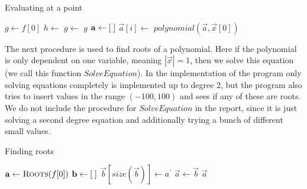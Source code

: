 \begin{algorithm}[H]
  \caption{Evaluating at a point}
  \begin{algorithmic}[1]
        \State $g\gets f[0]$
          \State $h\gets$ 
          \State $g\gets$ 
        \EndFor
        \State \Return $g$
      \Else
        \State $\mathbf{a}\gets[\hspace*{1mm}]$
          \State $\vec{a}[i]\gets$ 
        \EndFor
        \State \Return $polynomial(\vec{a},\vec{x}[0])$
      \EndIf
    \EndProcedure
  \end{algorithmic}
\end{algorithm}

The next procedure is used to find roots of a polynomial. Here if the polynomial is only dependent on one variable, meaning $|\vec{x}|=1$, then we solve this equation (we call this function $SolveEquation$). In the implementation of the program only solving equations completely is implemented up to degree 2, but the program also tries to insert values in the range $(-100,100)$ and sees if any of these are roots. We do not include the procedure for $SolveEquation$ in the report, since it is just solving a second degree equation and additionally trying a bunch of different small values.
\begin{algorithm}[H]
  \caption{Finding roots}
  \label{Alg: Roots}
  \begin{algorithmic}[1]
        \State \Return {}
      \Else
        \State $\vec{a}\gets \Call{Roots}{f[0]}$
          \State $\mathbf{b}\gets [\hspace*{1mm}]$
              \State $\vec{b}[size(\vec{b})]\gets a^\prime$
            \EndIf
          \EndFor
          \State $\vec{a}\gets \vec{b}$
        \EndFor
        \State \Return $\vec{a}$
      \EndIf
    \EndProcedure
  \end{algorithmic}
\end{algorithm}


